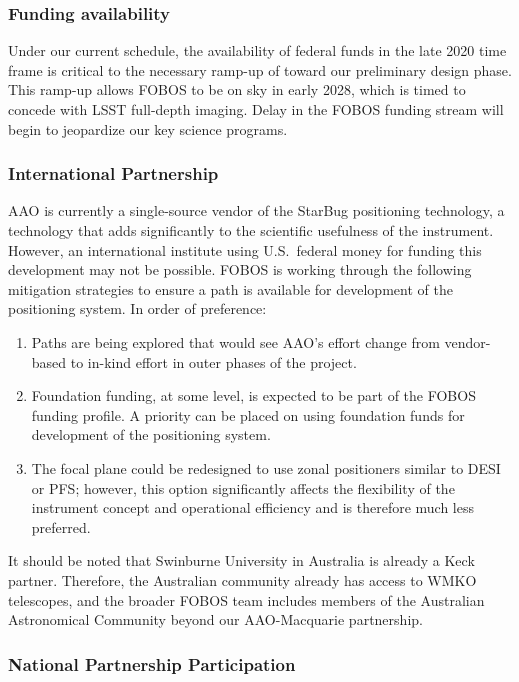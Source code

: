 \documentclass[oneside,11pt]{amsart}
\begin{document}
\subsubsection{Funding availability}

Under our current schedule, the availability of federal funds in the
late 2020 time frame is critical to the necessary ramp-up of toward
our preliminary design phase. This ramp-up allows FOBOS to be on sky
in early 2028, which is timed to concede with LSST full-depth
imaging. Delay in the FOBOS funding stream will begin to jeopardize
our key science programs.

\subsubsection{International Partnership}

AAO is currently a single-source vendor of the StarBug positioning
technology, a technology that adds significantly to the scientific
usefulness of the instrument. However, an international institute
using U.S.\ federal money for funding this development may not be possible.
FOBOS is working through the following mitigation strategies to
ensure a path is available for development of the positioning system.
In order of preference:

\begin{enumerate}
\item Paths are being explored that would see AAO's effort change
from vendor-based to in-kind effort in outer phases of the project.
\item Foundation funding, at some level, is expected to be part of
the FOBOS funding profile. A priority can be placed on using
foundation funds for development of the positioning system.
\item The focal plane could be redesigned to use zonal positioners
similar to DESI or PFS; however, this option significantly affects
the flexibility of the instrument concept and operational efficiency
and is therefore much less preferred.
\end{enumerate}

It should be noted that Swinburne University in Australia is already
a Keck partner. Therefore, the Australian community already has
access to WMKO telescopes, and the broader FOBOS team includes
members of the Australian Astronomical Community beyond our
AAO-Macquarie partnership.

\subsubsection{National Partnership Participation}
\end{document}
